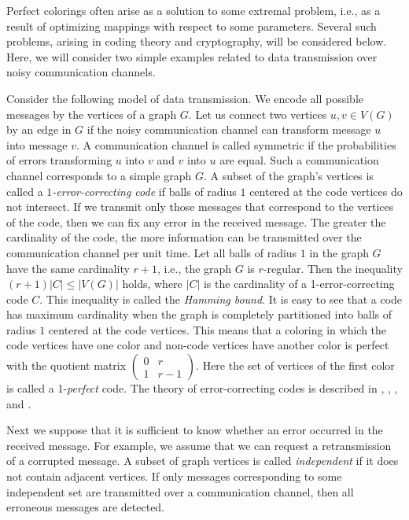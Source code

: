 \documentclass[11pt]{article}
\theoremstyle{definition}
\begin{document}
Perfect colorings often arise as a solution to some extremal problem, i.e., as a result of optimizing mappings with respect to some parameters. Several such problems, arising in coding theory and cryptography, will be considered below. Here, we will consider two simple examples related to data transmission over noisy communication channels.



Consider the following model of data transmission.
We encode all possible messages by the vertices of a graph $G$.
Let us connect two vertices $u, v \in V(G)$ by an edge in $G$ if the noisy communication channel can transform message $u$ into message
$v$. A communication channel is called symmetric if the probabilities of errors transforming $u$ into $v$ and $v$ into $u$ are equal. Such a communication channel
corresponds to a simple graph $G$.
A subset of the graph's vertices is called a {\sl $1$-error-correcting code}
if balls of radius $1$ centered at the code vertices do not intersect.
If we  transmit only those messages that correspond to the vertices
of the code,  then  we can fix  any error in the received message. The greater the cardinality
 of the code, the more information can be transmitted over
the communication channel per unit time. Let all balls of radius $1$ in the graph
$G$ have the same cardinality $r+1$, i.e., the graph $G$ is $r$-regular. Then
the inequality $(r+1)|C|\leq |V(G)|$ holds,  where $|C|$ is the cardinality of a 1-error-correcting code $C$. This inequality is called the {\sl Hamming bound}. It is easy to see that a code
has maximum cardinality when the graph
is completely partitioned into balls of radius $1$ centered at the code
vertices. This means that a coloring in which the code vertices have one color and non-code vertices have another color is perfect with the quotient matrix
$\begin{pmatrix}
0 & r \\
1 & r-1
\end{pmatrix}$.
Here the set of vertices of the first color  is called a 
1-{\sl perfect}  code.   The theory of
error-correcting codes is described in \cite{Etzion}, \cite{MacW},
\cite{Lint},  and \cite{Sol}.

Next we suppose that it is sufficient  to know whether an error occurred in  the received
message. For example, we  assume that we can  request a retransmission of a corrupted message.
A subset of graph vertices is called {\sl independent} if it does not contain adjacent vertices.
If only messages corresponding to
some independent set are transmitted over a communication channel, then all erroneous messages
are detected.
\end{document}
